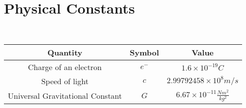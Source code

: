 \newpage






\section{Physical Constants}

\
\begin{table}[h]
	\caption{\label{tab:Constants}Table of Common Physical Constants}
	
	\begin{longtable}{|c |c| c |}
		\hline
		Quantity & Symbol & Value \\
		\hline
		Charge of an electron & $e^-$ & $1.6 \times 10^{-19}\si{C}$ \\
		\hline
		Speed of light & $c$ & $2.99792458 \times 10^8 \si{m/s}$ \\
		\hline
		Universal Gravitational Constant &  $G$ & $6.67 \times 10^{-11} \si{\frac{Nm^2}{kg^2}}$ \\
		\hline
	
	\end{longtable}
\end{table}
